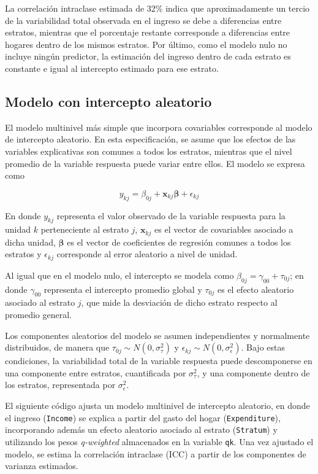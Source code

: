 \documentclass[
  spanish,
  12pt,
]{book}
\begin{document}
La correlación intraclase estimada de 32\% indica que aproximadamente un tercio de la variabilidad total observada en el ingreso se debe a diferencias entre estratos, mientras que el porcentaje restante corresponde a diferencias entre hogares dentro de los mismos estratos. Por último, como el modelo nulo no incluye ningún predictor, la estimación del ingreso dentro de cada estrato es constante e igual al intercepto estimado para ese estrato.

\subsection{Modelo con intercepto aleatorio}\label{sec-intercepto-aleatorio}

El modelo multinivel más simple que incorpora covariables corresponde al modelo de intercepto aleatorio. En esta especificación, se asume que los efectos de las variables explicativas son comunes a todos los estratos, mientras que el nivel promedio de la variable respuesta puede variar entre ellos. El modelo se expresa como

\[
y_{kj} = \beta_{0j} + \mathbf{x}_{kj}\boldsymbol{\beta} + \epsilon_{kj}
\]

En donde \(y_{kj}\) representa el valor observado de la variable respuesta para la unidad \(k\) perteneciente al estrato \(j\), \(\mathbf{x}_{kj}\) es el vector de covariables asociado a dicha unidad, \(\boldsymbol{\beta}\) es el vector de coeficientes de regresión comunes a todos los estratos y \(\epsilon_{kj}\) corresponde al error aleatorio a nivel de unidad.

Al igual que en el modelo nulo, el intercepto se modela como \(\beta_{0j} = \gamma_{00} + \tau_{0j}\); en donde \(\gamma_{00}\) representa el intercepto promedio global y \(\tau_{0j}\) es el efecto aleatorio asociado al estrato \(j\), que mide la desviación de dicho estrato respecto al promedio general.

Los componentes aleatorios del modelo se asumen independientes y normalmente distribuidos, de manera que \(\tau_{0j} \sim N(0,\sigma_{\tau}^{2})\) y \(\epsilon_{kj} \sim N(0,\sigma_{\epsilon}^{2})\). Bajo estas condiciones, la variabilidad total de la variable respuesta puede descomponerse en una componente entre estratos, cuantificada por \(\sigma_{\tau}^{2}\), y una componente dentro de los estratos, representada por \(\sigma_{\epsilon}^{2}\).

El siguiente código ajusta un modelo multinivel de intercepto aleatorio, en donde el ingreso (\texttt{Income}) se explica a partir del gasto del hogar (\texttt{Expenditure}), incorporando además un efecto aleatorio asociado al estrato (\texttt{Stratum}) y utilizando los pesos \emph{q-weighted} almacenados en la variable \texttt{qk}. Una vez ajustado el modelo, se estima la correlación intraclase (ICC) a partir de los componentes de varianza estimados.
\end{document}
